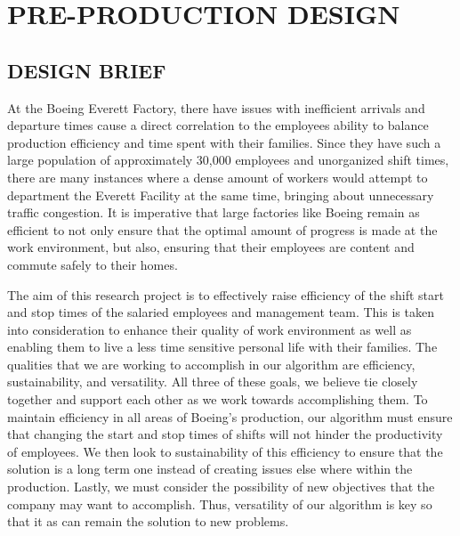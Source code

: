 \documentclass[a4,draftclsnofoot,onecolumn,margin=0.75,10pt]{IEEEtran}
\begin{document}
\section[PRE-PRODUCTION DESIGN]{\rmfamily\bfseries\color{black}
PRE-PRODUCTION DESIGN}

\subsection[DESIGN BRIEF]{\color{black}
DESIGN BRIEF}

{\color{black}
   At the Boeing Everett Factory, there have issues with inefficient arrivals and departure times cause a direct correlation to the employees ability to balance production efficiency and time spent with their families. Since they have such a large population of approximately 30,000 employees and unorganized shift times, there are many instances where a dense amount of workers would attempt to department the Everett Facility at the same time, bringing about unnecessary traffic congestion. It is imperative that large factories like Boeing remain as efficient to not only ensure that the optimal amount of progress is made at the work environment, but also, ensuring that their employees are content and commute safely to their homes.
  
   The aim of this research project is to effectively raise efficiency of the shift start and stop times of the salaried employees and management team. This is taken into consideration to enhance their quality of work environment as well as enabling them to live a less time sensitive personal life with their families. The qualities that we are working to accomplish in our algorithm are efficiency, sustainability, and versatility. All three of these goals, we believe tie closely together and support each other as we work towards accomplishing them. To maintain efficiency in all areas of Boeing's production, our algorithm must ensure that changing the start and stop times of shifts will not hinder the productivity of employees. We then look to sustainability of this efficiency to ensure that the solution is a long term one instead of creating issues else where within the production. Lastly, we must consider the possibility of new objectives that the company may want to accomplish. Thus, versatility of our algorithm is key so that it as can remain the solution to new problems.
   
}
\end{document}

